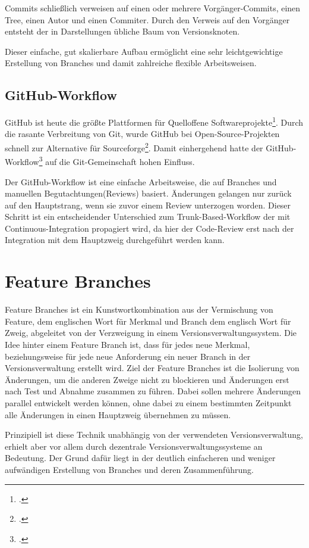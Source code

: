 Commits schließlich verweisen auf einen oder mehrere Vorgänger-Commits, einen Tree, einen Autor und einen Commiter. Durch den Verweis auf den Vorgänger entsteht der in Darstellungen übliche Baum von Versionsknoten.

Dieser einfache, gut skalierbare Aufbau ermöglicht eine sehr leichtgewichtige Erstellung von Branches und damit zahlreiche flexible Arbeitsweisen.

\subsection{GitHub-Workflow}

GitHub ist heute die größte Plattformen für Quelloffene Softwareprojekte\footcite{github-marketshare-datanyze}. Durch die rasante Verbreitung von Git, wurde GitHub bei Open-Source-Projekten schnell zur Alternative für Sourceforge\footcite{heise-github-2011}. Damit einhergehend hatte der GitHub-Workflow\footcite{github-workflow-intro} auf die Git-Gemeinschaft hohen Einfluss.

Der GitHub-Workflow ist eine einfache Arbeitsweise, die auf Branches und manuellen Begutachtungen(Reviews) basiert. Änderungen gelangen nur zurück auf den Hauptstrang, wenn sie zuvor einem Review unterzogen worden. Dieser Schritt ist ein entscheidender Unterschied zum Trunk-Based-Workflow der mit Continuous-Integration propagiert wird, da hier der Code-Review erst nach der Integration mit dem Hauptzweig durchgeführt werden kann.

\section{Feature Branches}

Feature Branches ist ein Kunstwortkombination aus der Vermischung von Feature, dem englischen Wort für Merkmal und Branch dem englisch Wort für Zweig, abgeleitet von der Verzweigung in einem Versionsverwaltungssystem. Die Idee hinter einem Feature Branch ist, dass für jedes neue Merkmal, beziehungsweise für jede neue Anforderung ein neuer Branch in der Versionsverwaltung erstellt wird. Ziel der Feature Branches ist die Isolierung von Änderungen, um die anderen Zweige nicht zu blockieren und Änderungen erst nach Test und Abnahme zusammen zu führen. Dabei sollen mehrere Änderungen parallel entwickelt werden können, ohne dabei zu einem bestimmten Zeitpunkt alle Änderungen in einen Hauptzweig übernehmen zu müssen.

Prinzipiell ist diese Technik unabhängig von der verwendeten Versionsverwaltung, erhielt aber vor allem durch dezentrale Versionsverwaltungssysteme an Bedeutung. Der Grund dafür liegt in der deutlich einfacheren und weniger aufwändigen Erstellung von Branches und deren Zusammenführung.


